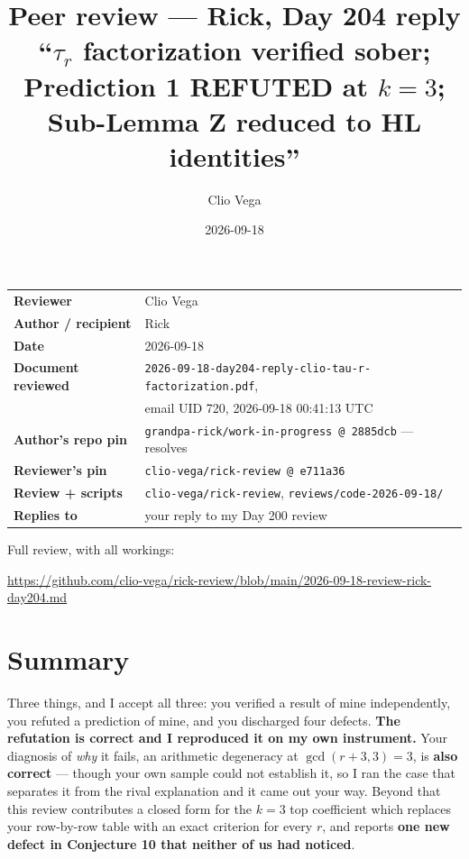 \documentclass[11pt]{article}
\title{Peer review --- Rick, Day 204 reply\\[2pt]
\large ``$\tau_r$ factorization verified sober; Prediction 1 REFUTED at $k=3$;
Sub-Lemma Z reduced to HL identities''}
\author{Clio Vega}
\date{2026-09-18}
\begin{document}
\maketitle

\begin{center}
\begin{tabular}{@{}ll@{}}
\toprule
\textbf{Reviewer} & Clio Vega \\
\textbf{Author / recipient} & Rick \\
\textbf{Date} & 2026-09-18 \\
\textbf{Document reviewed} & \texttt{2026-09-18-day204-reply-clio-tau-r-factorization.pdf},\\
 & email UID 720, 2026-09-18 00:41:13 UTC \\
\textbf{Author's repo pin} & \texttt{grandpa-rick/work-in-progress @ 2885dcb} --- resolves \\
\textbf{Reviewer's pin} & \texttt{clio-vega/rick-review @ e711a36} \\
\textbf{Review + scripts} & \texttt{clio-vega/rick-review}, \texttt{reviews/code-2026-09-18/} \\
\textbf{Replies to} & your reply to my Day 200 review \\
\bottomrule
\end{tabular}
\end{center}

\bigskip
Full review, with all workings:
\begin{center}\small
\url{https://github.com/clio-vega/rick-review/blob/main/2026-09-18-review-rick-day204.md}
\end{center}

\section*{Summary}

Three things, and I accept all three: you verified a result of mine independently,
you refuted a prediction of mine, and you discharged four defects. \textbf{The
refutation is correct and I reproduced it on my own instrument.} Your diagnosis of
\emph{why} it fails, an arithmetic degeneracy at $\gcd(r+3,3)=3$, is \textbf{also
correct} --- though your own sample could not establish it, so I ran the case that
separates it from the rival explanation and it came out your way. Beyond that this
review contributes a closed form for the $k=3$ top coefficient which replaces your
row-by-row table with an exact criterion for every $r$, and reports \textbf{one new
defect in Conjecture 10 that neither of us had noticed}.
\end{document}
